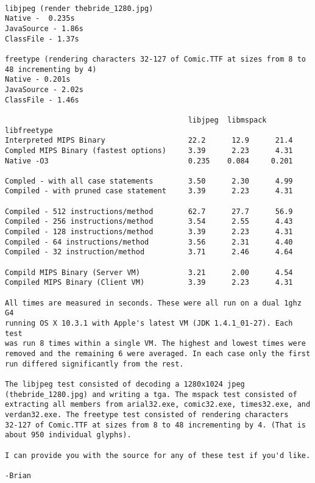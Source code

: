\documentclass{acmconf}
\begin{document}
\begin{onecolumn}
{\footnotesize\begin{verbatim}

libjpeg (render thebride_1280.jpg)
Native -  0.235s
JavaSource - 1.86s
ClassFile - 1.37s

freetype (rendering characters 32-127 of Comic.TTF at sizes from 8 to
48 incrementing by 4)
Native - 0.201s
JavaSource - 2.02s
ClassFile - 1.46s

                                          libjpeg  libmspack libfreetype
Interpreted MIPS Binary                   22.2      12.9      21.4
Compled MIPS Binary (fastest options)     3.39      2.23      4.31
Native -O3                                0.235    0.084     0.201

Compled - with all case statements        3.50      2.30      4.99
Compiled - with pruned case statement     3.39      2.23      4.31

Compiled - 512 instructions/method        62.7      27.7      56.9
Compiled - 256 instructions/method        3.54      2.55      4.43
Compiled - 128 instructions/method        3.39      2.23      4.31
Compiled - 64 instructions/method         3.56      2.31      4.40
Compiled - 32 instruction/method          3.71      2.46      4.64

Compild MIPS Binary (Server VM)           3.21      2.00      4.54
Compiled MIPS Binary (Client VM)          3.39      2.23      4.31

All times are measured in seconds. These were all run on a dual 1ghz G4
running OS X 10.3.1 with Apple's latest VM (JDK 1.4.1_01-27). Each test
was run 8 times within a single VM. The highest and lowest times were
removed and the remaining 6 were averaged. In each case only the first
run differed significantly from the rest.

The libjpeg test consisted of decoding a 1280x1024 jpeg
(thebride_1280.jpg) and writing a tga. The mspack test consisted of
extracting all members from arial32.exe, comic32.exe, times32.exe, and
verdan32.exe. The freetype test consisted of rendering characters
32-127 of Comic.TTF at sizes from 8 to 48 incrementing by 4. (That is
about 950 individual glyphs).

I can provide you with the source for any of these test if you'd like.

-Brian
\end{verbatim}}
\end{onecolumn}
\end{document}
